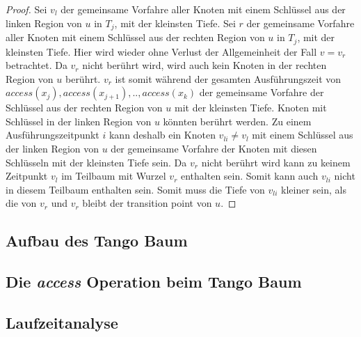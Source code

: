 \documentclass[a4paper,12pt]{article}
\begin{document}
\begin{proof}
 Sei $v_l$ der gemeinsame Vorfahre aller Knoten mit einem Schlüssel aus der linken Region von $u$ in $T_j$, mit der kleinsten Tiefe. Sei $r$ der gemeinsame Vorfahre aller Knoten mit einem Schlüssel aus der rechten Region von $u$ in $T_j$, mit der kleinsten Tiefe. Hier wird wieder ohne Verlust der Allgemeinheit der Fall $v = v_r$ betrachtet. Da $v_r$ nicht berührt wird, wird auch kein Knoten in der rechten Region von $u$ berührt. $v_r$ ist somit während der gesamten Ausführungszeit von $\textit{access}\left(x_j\right),\textit{access}\left(x_{j+1}\right),..,\textit{access}\left(x_k\right)$  der gemeinsame Vorfahre der Schlüssel aus der rechten Region von $u$ mit der kleinsten Tiefe. Knoten mit Schlüssel in der linken Region von $u$ könnten berührt werden. Zu einem Ausführungszeitpunkt $i$ kann deshalb ein Knoten $v_{li} \ne v_l$ mit einem Schlüssel aus der linken Region von $u$ der gemeinsame Vorfahre der Knoten mit diesen Schlüsseln mit der kleinsten Tiefe sein. Da $v_r$ nicht berührt wird kann zu keinem Zeitpunkt $v_l$ im Teilbaum mit Wurzel $v_r$ enthalten sein. Somit kann auch $v_{li}$ nicht in diesem Teilbaum enthalten sein. Somit muss die Tiefe von  $v_{li}$ kleiner sein, als die von $v_r$ und $v_r$ bleibt der transition point von $u$. 
	
\end{proof}
















\subsection{Aufbau des Tango Baum} \label{aufbauDesTango}
\subsection{Die \textit{access} Operation beim Tango Baum}
\subsection{Laufzeitanalyse}
\newpage


\end{document}
